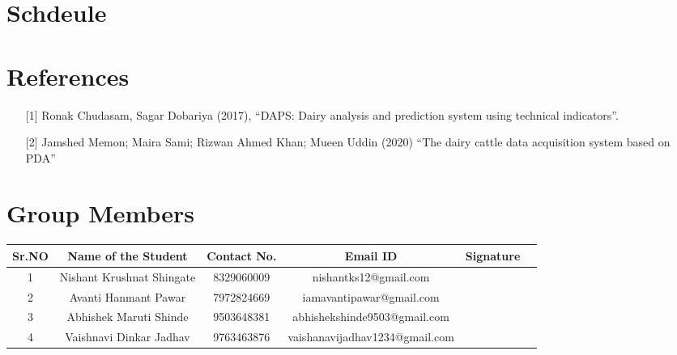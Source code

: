 \documentclass[english]{article}
\begin{document}


\section{Schdeule} %

\section*{References}
\vspace{20pt}

\begin{itemize}
\item[][1]	Ronak Chudasam, Sagar Dobariya (2017), “DAPS: Dairy analysis and prediction system using technical indicators”.

\item[][2]	Jamshed Memon; Maira Sami; Rizwan Ahmed Khan; Mueen Uddin (2020) “The dairy cattle data acquisition system based on PDA”

\end{itemize}

\vspace{20pt}

\section*{Group Members}
\vspace{20pt}

\centering
\begin{tabular}{ | c | c | c | c | c | c |}
     
\hline \bf{Sr.NO} &\textbf{Name of the Student} &\textbf{Contact No.} &\textbf{Email ID} 
&\textbf{Signature}  \\ 
     \hline   1 &Nishant Krushnat Shingate&8329060009&nishantks12@gmail.com &\\ 
     \hline   2 &Avanti Hanmant Pawar&7972824669&iamavantipawar@gmail.com&\\ 
     \hline   3 &Abhishek Maruti Shinde&9503648381&abhishekshinde9503@gmail.com &    \\
     \hline   4 &Vaishnavi Dinkar Jadhav &9763463876 &vaishanavijadhav1234@gmail.com & \\ 
     \hline
    
      
\end{tabular}
\end{document}

